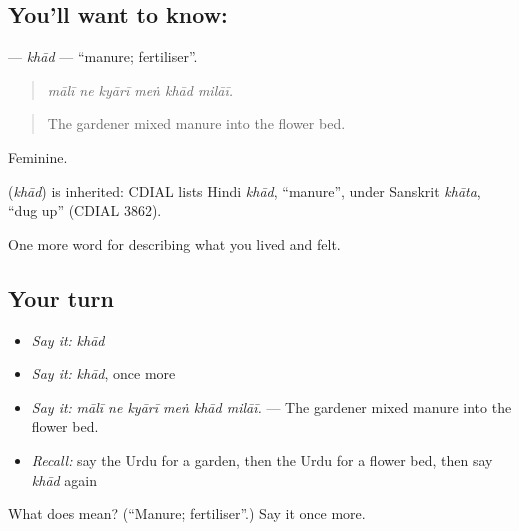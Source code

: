 \subsection*{You'll want to know: }
\textbf{} — \emph{khād} — \textquotedblleft{}manure; fertiliser\textquotedblright{}.

\begin{quote}
     
\end{quote}

\begin{quote}
\emph{mālī ne kyārī meṅ khād milāī.}
\end{quote}

\begin{quote}
The gardener mixed manure into the flower bed.
\end{quote}

Feminine.

\begin{cousinweb}
\textbf{} (\emph{khād}) is inherited: CDIAL lists Hindi \emph{khād}, \textquotedblleft{}manure\textquotedblright{}, under Sanskrit \emph{khāta}, \textquotedblleft{}dug up\textquotedblright{} (CDIAL 3862).
\end{cousinweb}

\begin{grammarlens}[title={What you've built}]
One more word for describing what you lived and felt.
\end{grammarlens}

\subsection*{Your turn}
\begin{itemize}
\raggedright
  \item \emph{Say it:} \emph{khād}
  \item \emph{Say it:} \emph{khād}, once more
  \item \emph{Say it:} \emph{mālī ne kyārī meṅ khād milāī.} — The gardener mixed manure into the flower bed.
  \item \emph{Recall:} say the Urdu for a garden, then the Urdu for a flower bed, then say \emph{khād} again
\end{itemize}

\begin{tcolorbox}[breakable,colback=teal!4,colframe=teal!35!black,title={Before you move on}]
What does  mean? (\textquotedblleft{}Manure; fertiliser\textquotedblright{}.) Say it once more.
\end{tcolorbox}
